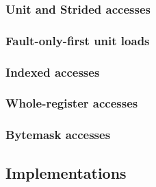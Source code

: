 \subsubsection{Unit and Strided accesses}

\subsubsection{Fault-only-first unit loads}

\subsubsection{Indexed accesses}

\subsubsection{Whole-register accesses}

\subsubsection{Bytemask accesses}


\subsection{Implementations}